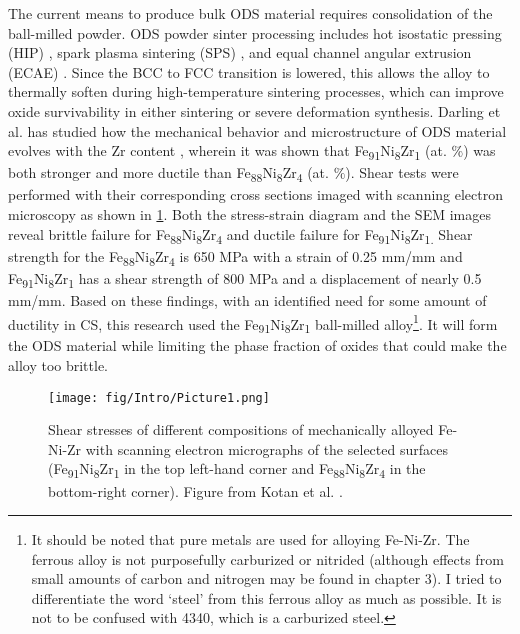 	The current means to produce bulk ODS material requires consolidation of the ball-milled powder. ODS powder sinter processing includes hot isostatic pressing (HIP) \cite{RN95}, spark plasma sintering (SPS) \cite{RN50}, and equal channel angular extrusion (ECAE) \cite{RN961, RN140, RN1026}. Since the BCC to FCC transition is lowered, this allows the alloy to thermally soften during high-temperature sintering processes, which can improve oxide survivability in either sintering or severe deformation synthesis. Darling et al. has studied how the mechanical behavior and microstructure of ODS material evolves with the Zr content\textsubscript{ }\cite{RN476}, wherein it was shown that Fe\textsubscript{91}Ni\textsubscript{8}Zr\textsubscript{1 }(at. $\%$) was both stronger and more ductile than Fe\textsubscript{88}Ni\textsubscript{8}Zr\textsubscript{4} (at. $\%$). Shear tests were performed with their corresponding cross sections imaged with scanning electron microscopy as shown in \ref{fig:Intro1}. Both the stress-strain diagram and the SEM images reveal brittle failure for Fe\textsubscript{88}Ni\textsubscript{8}Zr\textsubscript{4} and ductile failure for Fe\textsubscript{91}Ni\textsubscript{8}Zr\textsubscript{1. }Shear strength for the Fe\textsubscript{88}Ni\textsubscript{8}Zr\textsubscript{4 }is 650 MPa with a strain of 0.25 mm/mm and\textsubscript{ }Fe\textsubscript{91}Ni\textsubscript{8}Zr\textsubscript{1 }has a shear strength of 800 MPa and a displacement of nearly 0.5 mm/mm. Based on these findings, with an identified need for some amount of ductility in CS, this research used the Fe\textsubscript{91}Ni\textsubscript{8}Zr\textsubscript{1 }ball-milled alloy\footnote{ It should be noted that pure metals are used for alloying Fe-Ni-Zr. The ferrous alloy is not purposefully carburized or nitrided (although effects from small amounts of carbon and nitrogen may be found in chapter 3). I tried to differentiate the word ‘steel’ from this ferrous alloy as much as possible. It is not to be confused with 4340, which is a carburized steel.  }. It will form the ODS material while limiting the phase fraction of oxides that could make the alloy too brittle. 
	
	
	\begin{figure}
		\centering
		\texttt{[image: fig/Intro/Picture1.png]}
		\caption[Shear stresses of different compositions of mechanically alloyed Fe-Ni-Zr with scanning electron micrographs of the selected surfaces (Fe\textsubscript{91}Ni\textsubscript{8}Zr\textsubscript{1} in the top left-hand corner and Fe\textsubscript{88}Ni\textsubscript{8}Zr\textsubscript{4} in the bottom-right corner).]{Shear stresses of different compositions of mechanically alloyed Fe-Ni-Zr with scanning electron micrographs of the selected surfaces (Fe\textsubscript{91}Ni\textsubscript{8}Zr\textsubscript{1} in the top left-hand corner and Fe\textsubscript{88}Ni\textsubscript{8}Zr\textsubscript{4} in the bottom-right corner). Figure from Kotan et al. \cite{RN476}.}
		\label{fig:Intro1}
	\end{figure}

